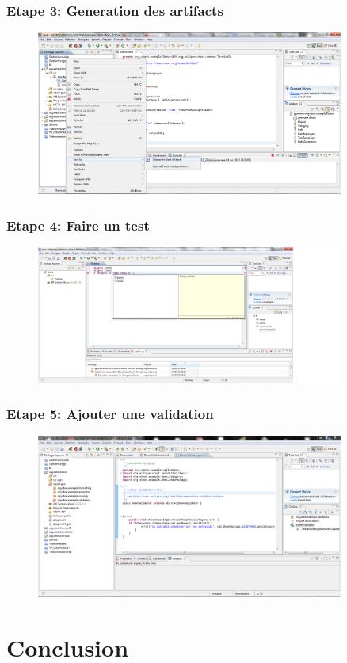 \documentclass{beamer}
\begin{document}
	\begin{frame}
	\frametitle{Etape 3: Generation des artifacts}
	\begin{figure}[h]
	\centering
			\includegraphics[width=0.90\textwidth]{3.PNG}
	\label{fig:3}
\end{figure}

\end{frame} 
	\begin{frame}
	\frametitle{Etape 4: Faire un test}
	\begin{figure}[h]
	\centering
			\includegraphics[width=0.90\textwidth]{4.PNG}
	\label{fig:4}
\end{figure}

\end{frame} 	\begin{frame}
	\frametitle{Etape 5: Ajouter une validation}
	\begin{figure}[h]
	\centering
			\includegraphics[width=0.90\textwidth]{5.PNG}
	\label{fig:5}
\end{figure}

\end{frame} 



\section{Conclusion}
\end{document}
